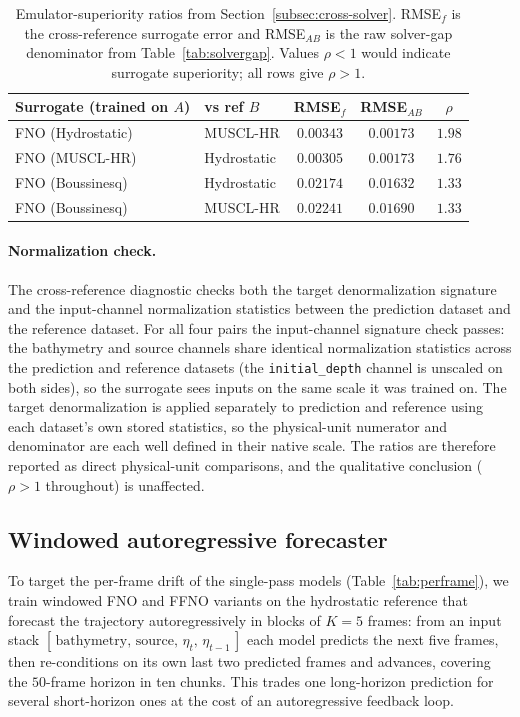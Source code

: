 \begin{table}[!htbp]
\centering
\caption{Emulator-superiority ratios from Section~\ref{subsec:cross-solver}. RMSE$_f$ is the cross-reference surrogate error and RMSE$_{AB}$ is the raw solver-gap denominator from Table~\ref{tab:solvergap}. Values $\rho<1$ would indicate surrogate superiority; all rows give $\rho>1$.}
\label{tab:superiority}
\begin{tabular}{llccc}
    \toprule
    Surrogate (trained on $A$) & vs ref $B$ & RMSE$_{f}$ & RMSE$_{AB}$ & $\rho$ \\
    \midrule
    FNO (Hydrostatic) & MUSCL-HR    & $0.00343$ & $0.00173$ & $1.98$ \\
    FNO (MUSCL-HR)    & Hydrostatic & $0.00305$ & $0.00173$ & $1.76$ \\
    FNO (Boussinesq)  & Hydrostatic & $0.02174$ & $0.01632$ & $1.33$ \\
    FNO (Boussinesq)  & MUSCL-HR    & $0.02241$ & $0.01690$ & $1.33$ \\
    \bottomrule
\end{tabular}
\end{table}

\paragraph{Normalization check.}
The cross-reference diagnostic checks both the target denormalization signature and the input-channel normalization statistics between the prediction dataset and the reference dataset. For all four pairs the input-channel signature check passes: the bathymetry and source channels share identical normalization statistics across the prediction and reference datasets (the \texttt{initial\_depth} channel is unscaled on both sides), so the surrogate sees inputs on the same scale it was trained on. The target denormalization is applied separately to prediction and reference using each dataset's own stored statistics, so the physical-unit numerator and denominator are each well defined in their native scale. The ratios are therefore reported as direct physical-unit comparisons, and the qualitative conclusion ($\rho>1$ throughout) is unaffected.

\subsection{Windowed autoregressive forecaster}
\label{subsec:res-window}

To target the per-frame drift of the single-pass models (Table~\ref{tab:perframe}), we train windowed FNO and FFNO variants on the hydrostatic reference that forecast the trajectory autoregressively in blocks of $K = 5$ frames: from an input stack $[\,\text{bathymetry},\, \text{source},\, \eta_t,\, \eta_{t - 1}\,]$ each model predicts the next five frames, then re-conditions on its own last two predicted frames and advances, covering the $50$-frame horizon in ten chunks. This trades one long-horizon prediction for several short-horizon ones at the cost of an autoregressive feedback loop.

